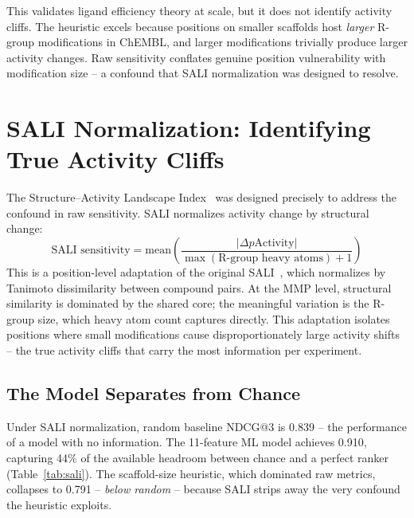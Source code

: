 \documentclass[sigconf, nonacm]{acmart}
\begin{document}
This validates ligand efficiency theory at scale, but it does not identify activity cliffs. The heuristic excels because positions on smaller scaffolds host \textit{larger} R-group modifications in ChEMBL, and larger modifications trivially produce larger activity changes. Raw sensitivity conflates genuine position vulnerability with modification size -- a confound that SALI normalization was designed to resolve.

\section{SALI Normalization: Identifying True Activity Cliffs}

The Structure--Activity Landscape Index~\cite{Guha2008} was designed precisely to address the confound in raw sensitivity. SALI normalizes activity change by structural change:
\begin{equation}
  \text{SALI sensitivity} = \text{mean}\!\left(
    \frac{|\Delta p\mathrm{Activity}|}
         {\max(\text{R-group heavy atoms}) + 1}
  \right)
\end{equation}
This is a position-level adaptation of the original SALI~\cite{Guha2008}, which normalizes by Tanimoto dissimilarity between compound pairs. At the MMP level, structural similarity is dominated by the shared core; the meaningful variation is the R-group size, which heavy atom count captures directly. This adaptation isolates positions where small modifications cause disproportionately large activity shifts -- the true activity cliffs that carry the most information per experiment.

\subsection{The Model Separates from Chance}

Under SALI normalization, random baseline NDCG@3 is 0.839 -- the performance of a model with no information. The 11-feature ML model achieves 0.910, capturing 44\% of the available headroom between chance and a perfect ranker (Table~\ref{tab:sali}). The scaffold-size heuristic, which dominated raw metrics, collapses to 0.791 -- \textit{below random} -- because SALI strips away the very confound the heuristic exploits.
\end{document}
